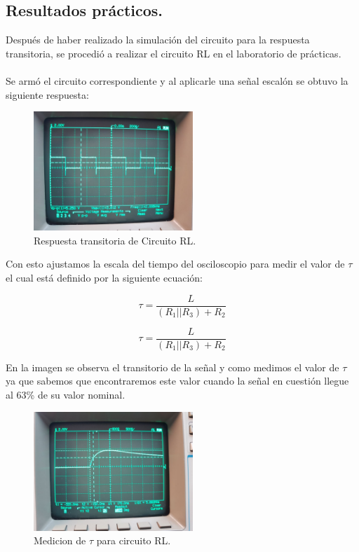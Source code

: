\documentclass[12pt,a4paper]{article}
\newcounter{ns}
\begin{document}
\subsection{Resultados prácticos.}
Después de haber realizado la simulación del circuito para la respuesta transitoria, se procedió a realizar el circuito RL en el laboratorio de prácticas.\\
	\\
	Se armó el circuito correspondiente y al aplicarle una señal escalón se obtuvo la siguiente respuesta:
	
	\begin{figure}[h!]
		\centering
		\includegraphics[width=6cm]{1}
		\caption{Respuesta transitoria de Circuito RL.}
	\end{figure}

	Con esto ajustamos la escala del tiempo del osciloscopio para medir el valor de $\tau$ el cual está definido por la siguiente ecuación:
	
	\begin{equation*}
		\tau = \frac{L}{(R_1||R_3)+R_2}
	\end{equation*}
	
	\begin{equation*}
	\tau = \frac{L}{(R_1||R_3)+R_2}
	\end{equation*}
	
	En la imagen se observa el transitorio de la señal y como medimos el valor de $\tau$ ya que sabemos que encontraremos este valor cuando la señal en cuestión llegue al 63\% de su valor nominal.
	
	\begin{figure}[h!]
		\centering
		\includegraphics[width=6cm]{2}
		\caption{Medicion de $\tau$ para circuito RL.}
	\end{figure}
\end{document}
